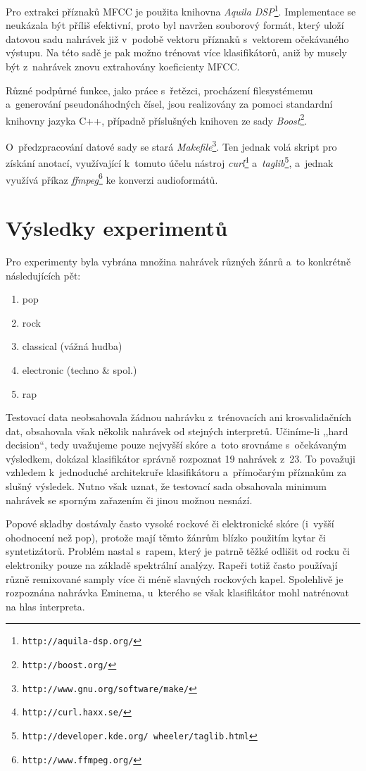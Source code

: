 \documentclass[10pt,a4paper,twocolumn]{article}
\begin{document}
Pro extrakci příznaků MFCC je použita knihovna \emph{Aquila DSP}\footnote{\texttt{http://aquila-dsp.org/}}.
Implementace se neukázala být příliš efektivní, proto byl navržen souborový formát,
který uloží datovou sadu nahrávek již v~podobě vektoru příznaků s~vektorem očekávaného výstupu.
Na této sadě je pak možno trénovat více klasifikátorů, aniž by musely být z~nahrávek
znovu extrahovány koeficienty MFCC.

Různé podpůrné funkce, jako práce s~řetězci, procházení filesystémemu a~generování pseudonáhodných čísel, jsou realizovány
za pomoci standardní knihovny jazyka C++, případně příslušných knihoven ze sady \emph{Boost}\footnote{\texttt{http://boost.org/}}.

O~předzpracování datové sady se stará \emph{Makefile}\footnote{\texttt{http://www.gnu.org/software/make/}}.
Ten jednak volá skript pro získání anotací, využívající k~tomuto účelu nástroj \emph{curl}\footnote{\texttt{http://curl.haxx.se/}}
a~\emph{taglib}\footnote{\texttt{http://developer.kde.org/~wheeler/taglib.html}},
a~jednak využívá příkaz \emph{ffmpeg}\footnote{\texttt{http://www.ffmpeg.org/}} ke konverzi audioformátů.

\section{Výsledky experimentů}

Pro experimenty byla vybrána množina nahrávek různých žánrů a~to konkrétně následujících pět:

\begin{enumerate}
\item pop
\item rock
\item classical (vážná hudba)
\item electronic (techno \& spol.)
\item rap
\end{enumerate}

Testovací data neobsahovala žádnou nahrávku z~trénovacích ani krosvalidačních dat,
obsahovala však několik nahrávek od stejných interpretů.
Učiníme-li ,,hard decision``, tedy uvažujeme pouze nejvyšší skóre a~toto srovnáme
s~očekávaným výsledkem, dokázal klasifikátor správně rozpoznat 19 nahrávek z~23.
To považuji vzhledem k~jednoduché architekruře klasifikátoru a~přímočarým příznakům
za slušný výsledek. Nutno však uznat, že testovací sada obsahovala minimum
nahrávek se sporným zařazením či jinou možnou nesnází.

Popové skladby dostávaly často vysoké rockové či elektronické skóre (i~vyšší ohodnocení než pop),
protože mají těmto žánrům blízko použitím kytar či syntetizátorů.
Problém nastal s~rapem, který je patrně těžké odlišit od rocku či elektroniky
pouze na základě spektrální analýzy.
Rapeři totiž často používají různě remixované samply více či méně slavných rockových kapel.
Spolehlivě je rozpoznána nahrávka Eminema,
u~kterého se však klasifikátor mohl natrénovat na hlas interpreta.
\end{document}
